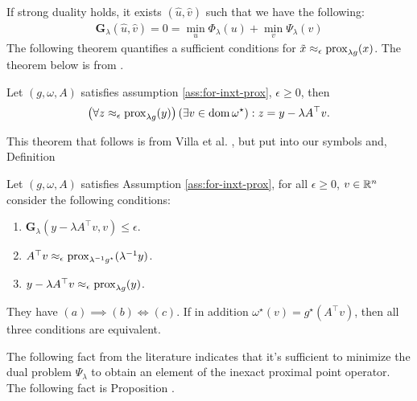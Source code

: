 \documentclass[12pt]{article}
\begin{document}
        If strong duality holds, it exists $(\hat u, \hat v)$ such that we have the following: 
        \begin{align*}
            \mathbf G_\lambda(\hat u, \hat v) = 0 = \min_{u} \Phi_\lambda(u) + \min_v \Psi_\lambda(v)
        \end{align*}
        The following theorem quantifies a sufficient conditions for $\tilde x \approx_\epsilon \operatorname{prox}_{\lambda g}(x)$. 
        The theorem below is from \cite[Proposition 2.2]{villa_accelerated_2013}. 
        \begin{theorem}\label{thm:primal-dual-trans}
            Let $(g, \omega, A)$ satisfies assumption \ref{ass:for-inxt-prox}, $\epsilon \ge 0$, then 
            \begin{align*}
                \left(
                    \forall z \approx_\epsilon \operatorname{prox}_{\lambda g}(y) 
                \right)(\exists v \in \operatorname{dom} \omega^\star): z = y - \lambda A^\top v. 
            \end{align*}
        \end{theorem}
        This theorem that follows is from Villa et al. \cite[Proposition 2.3]{villa_accelerated_2013}, but put into our symbols and, Definition 
        \begin{theorem}\label{thm:dlty-gap-inxt-pp}
            Let $(g, \omega, A)$ satisfies Assumption \ref{ass:for-inxt-prox}, for all $\epsilon \ge 0$, $v \in \mathbb R^n$ consider the following conditions: 
            \begin{enumerate}[nosep]
                \item $\mathbf G_\lambda(y - \lambda A^\top v, v) \le \epsilon$. 
                \item $A^\top v \approx_\epsilon \operatorname{prox}_{\lambda^{-1}g^\star}(\lambda^{-1}y)$. 
                \item $y - \lambda A^\top v \approx_{\epsilon} \operatorname{prox}_{\lambda g}(y)$. 
            \end{enumerate}
            They have $(a)\implies (b) \iff (c)$. 
            If in addition $\omega^\star(v) = g^\star(A^\top v)$, then all three conditions are equivalent. 
        \end{theorem}
        The following fact from the literature indicates that it's sufficient to minimize the dual problem $\Psi_\lambda$ to obtain an element of the inexact proximal point operator. 
        The following fact is Proposition \cite[Theorem 5.1]{villa_accelerated_2013}. 
\end{document}
